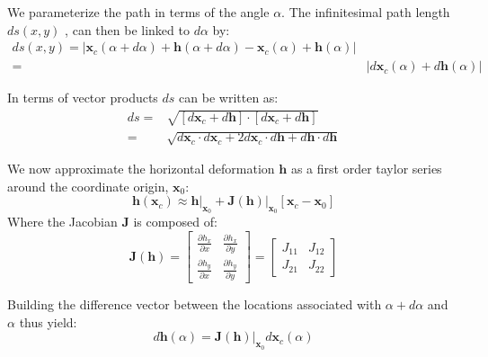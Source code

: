 \documentclass[a4paper,10pt,twoside,openany]{article}
\begin{document}
We parameterize the path in terms of the angle $\alpha$. The infinitesimal path length $ds(x,y)$ , can then be
linked to $d\alpha$ by:
\begin{equation}
  \begin{split}
  ds(x,y)=|\textbf{x}_{c}(\alpha+d\alpha)+\textbf{h}(\alpha+d\alpha)-\textbf{x}_{c}(\alpha)+\textbf{h}(\alpha)|\\
  =&|d\textbf{x}_{c}(\alpha)+d\textbf{h}(\alpha)|\end{split}
\end{equation}

In terms of vector products $ds$ can be written as:
\begin{equation}\begin{split}
  d s =&
  \sqrt{[d\textbf{x}_{c}+d\textbf{h}]\cdot[d\textbf{x}_{c}+d\textbf{h}]}\\
  =& \sqrt{d\textbf{x}_{c} \cdot d\textbf{x}_{c}  +2
  d\textbf{x}_{c}\cdot d\textbf{h}+ d\textbf{h} \cdot d\textbf{h}} \end{split}
  \label{eq:2} \end{equation}

We now approximate the horizontal deformation $\textbf{h}$ as a
first order taylor series around the coordinate origin,
$\textbf{x}_{0}$:
\begin{equation}
  \textbf{h}(\textbf{x}_{c})\approx\textbf{h}\bigg|_{\textbf{x}_{0}} +
  \textbf{J}(\textbf{h})\bigg|_{\textbf{x}_{0}} [\textbf{x}_{c}-\textbf{x}_{0}]
\end{equation}
Where the Jacobian $\textbf{J}$ is composed of:
\begin{equation}
 \textbf{J}(\textbf{h})=\left[\begin{array}{cc}\frac{\partial
       h_{x}}{\partial x} & \frac{\partial h_{x}}{\partial y}\\\frac{\partial
       h_{y}}{\partial x} & \frac{\partial h_{y}}{\partial
       y}\end{array}\right]=\left[\begin{array}{cc}J_{11}
     &J_{12}\\J_{21}& J_{22}\end{array}\right]
\end{equation}

Building the difference vector between the locations associated with
$\alpha+d\alpha$ and $\alpha$ thus yield:
\begin{equation}
  d\textbf{h}(\alpha)=\textbf{J}(\textbf{h})\bigg|_{\textbf{x}_{0}} d\textbf{x}_{c}(\alpha)
\end{equation}
\end{document}
